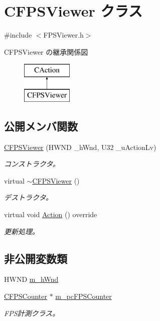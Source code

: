 \hypertarget{class_c_f_p_s_viewer}{}\section{C\+F\+P\+S\+Viewer クラス}
\label{class_c_f_p_s_viewer}


{\ttfamily \#include $<$F\+P\+S\+Viewer.\+h$>$}

C\+F\+P\+S\+Viewer の継承関係図\begin{figure}[H]
\begin{center}
\leavevmode
\includegraphics[height=2.000000cm]{class_c_f_p_s_viewer}
\end{center}
\end{figure}
\subsection*{公開メンバ関数}
\begin{DoxyCompactItemize}
\item 
\hyperlink{class_c_f_p_s_viewer_aee0922eb44152f58586245862a66586e}{C\+F\+P\+S\+Viewer} (H\+W\+N\+D \+\_\+h\+Wnd, U32 \+\_\+u\+Action\+Lv)
\begin{DoxyCompactList}\small\item\em コンストラクタ。 \end{DoxyCompactList}\item 
virtual \hyperlink{class_c_f_p_s_viewer_a98af679a51ac2947e8d7a232321b1abc}{$\sim$\+C\+F\+P\+S\+Viewer} ()
\begin{DoxyCompactList}\small\item\em デストラクタ。 \end{DoxyCompactList}\item 
virtual void \hyperlink{class_c_f_p_s_viewer_abde661517b45dbe7cd19a86ef8a0b2af}{Action} () override
\begin{DoxyCompactList}\small\item\em 更新処理。 \end{DoxyCompactList}\end{DoxyCompactItemize}
\subsection*{非公開変数類}
\begin{DoxyCompactItemize}
\item 
H\+W\+N\+D \hyperlink{class_c_f_p_s_viewer_a096208af929712b964e2c80fe70da6f6}{m\+\_\+h\+Wnd}
\item 
\hyperlink{class_c_f_p_s_counter}{C\+F\+P\+S\+Counter} $\ast$ \hyperlink{class_c_f_p_s_viewer_a33af8585644a97027e76133aefcec5fb}{m\+\_\+pc\+F\+P\+S\+Counter}
\begin{DoxyCompactList}\small\item\em F\+P\+S計測クラス。 \end{DoxyCompactList}\end{DoxyCompactItemize}
